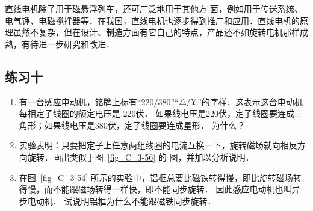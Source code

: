 直线电机除了用于磁悬浮列车，还可广泛地用于其他方
面，例如用于传送系统、电气锤、电磁搅拌器等．在我国，直线电机也逐步得到推广和应用．直线电机的原理虽然不复杂，但在设计、制造方面有它自己的特点，产品还不如旋转电机那样成熟，有待进一步研究和改进．

\subsection*{练习十}
\begin{enumerate}
    \item 有一台感应电动机，铭牌上标有“$220/380$”“$\triangle/\rm{Y}$”的字样．这表示这台电动机每相定子线圈的额定电压是 220伏．
    如果线电压是220伏，定子线圈要连成三角形；如果线电压是380伏，定子线圈要连成星形．
    为什么？
    \item 实验表明：只要把定子上任意两组线圈的电流互换一下，旋转磁场就向相反方向旋转．画出类似于图~\ref{fig_C_3-56} 的
    图，并加以分析说明．
    \item 在图~\ref{fig_C_3-54} 所示的实验中，铝框总要比磁铁转得慢，即比旋转磁场转得慢，而不能跟磁场转得一样快，即不能同步旋转．
    因此感应电动机也叫异步电动机．
    试说明铝框为什么不能跟磁铁同步旋转．
\end{enumerate}

